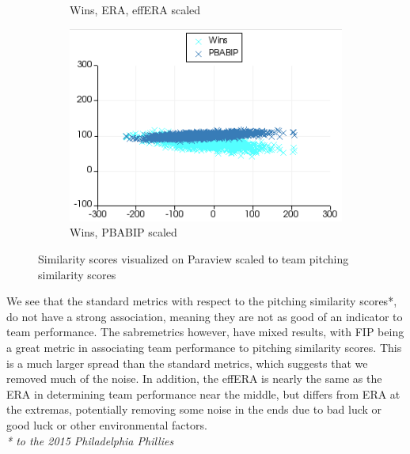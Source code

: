 \documentclass[12pt]{article}
\numberwithin{equation}{subsection}
\begin{document}
\begin{figure}[H]
\begin{subfigure}[b]{0.5\linewidth}
    \caption{Wins, ERA, effERA scaled} 
    \label{fig5:c} 
  \end{subfigure}%
  \begin{subfigure}[b]{0.5\linewidth}
    \centering
    \includegraphics[width=0.9\linewidth]{similarpitch6} 
    \caption{Wins, PBABIP scaled} 
    \label{fig5:d} 
  \end{subfigure} 
  \caption{Similarity scores visualized on Paraview scaled to team pitching similarity scores}
  \label{fig5} 
\end{figure}


\noindent We see that the standard metrics with respect to the pitching similarity scores*, do not have a strong association, meaning they are not as good of an indicator to team performance. The sabremetrics however, have mixed results, with FIP being a great metric in associating team performance to pitching similarity scores. This is a much larger spread than the standard metrics, which suggests that we removed much of the noise. In addition, the effERA is nearly the same as the ERA in determining team performance near the middle, but differs from ERA at the extremas, potentially removing some noise in the ends due to bad luck or good luck or other environmental factors. \\

\noindent\textit{* to the 2015 Philadelphia Phillies}
\end{document}
